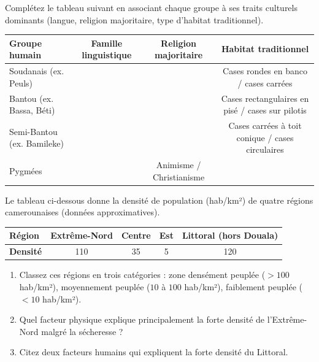 \documentclass[11pt]{article}
\begin{document}
\begin{exercice}
Complétez le tableau suivant en associant chaque groupe à ses traits culturels dominants (langue, religion majoritaire, type d'habitat traditionnel).
\begin{center}
\begin{tabularx}{\linewidth}{|X|c|c|c|}
\hline
\textbf{Groupe humain} & \textbf{Famille linguistique} & \textbf{Religion majoritaire} & \textbf{Habitat traditionnel} \\ \hline
Soudanais (ex. Peuls) &  &  & Cases rondes en banco / cases carrées \\ \hline
Bantou (ex. Bassa, Béti) &  &  & Cases rectangulaires en pisé / cases sur pilotis \\ \hline
Semi-Bantou (ex. Bamileke) &  &  & Cases carrées à toit conique / cases circulaires \\ \hline
Pygmées &  & Animisme / Christianisme &  \\ \hline
\end{tabularx}
\end{center}
\end{exercice}

\begin{exercice}
Le tableau ci-dessous donne la densité de population (hab/km²) de quatre régions camerounaises (données approximatives).
\begin{center}
\begin{tabular}{|l|c|c|c|c|}
\hline
\textbf{Région} & \textbf{Extrême-Nord} & \textbf{Centre} & \textbf{Est} & \textbf{Littoral (hors Douala)} \\ \hline
\textbf{Densité} & 110 & 35 & 5 & 120 \\ \hline
\end{tabular}
\end{center}
\begin{enumerate}
    \item Classez ces régions en trois catégories : zone densément peuplée ($> 100$ hab/km²), moyennement peuplée ($10$ à $100$ hab/km²), faiblement peuplée ($< 10$ hab/km²).
    \item Quel facteur physique explique principalement la forte densité de l'Extrême-Nord malgré la sécheresse ?
    \item Citez deux facteurs humains qui expliquent la forte densité du Littoral.
\end{enumerate}
\end{exercice}
\end{document}
